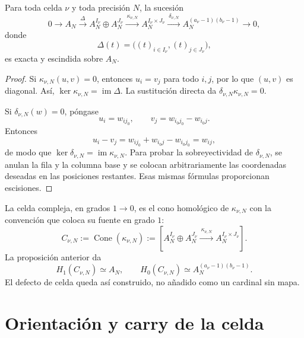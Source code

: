\begin{proposition}
\label{prop:pdfv2-coh-cell-exact}
Para toda celda \(\nu\) y toda precisión \(N\), la sucesión
\begin{equation}\label{eq:pdfv2-coh-exact-sequence}
 0\longrightarrow A_N
 \xrightarrow{\ \Delta\ }
 A_N^{I_\nu}\oplus A_N^{J_\nu}
 \xrightarrow{\ \kappa_{\nu,N}\ }
 A_N^{I_\nu\times J_\nu}
 \xrightarrow{\ \delta_{\nu,N}\ }
 A_N^{(a_\nu-1)(b_\nu-1)}
 \longrightarrow0,
\end{equation}
donde
\[
 \Delta(t)=\bigl((t)_{i\in I_\nu},(t)_{j\in J_\nu}\bigr),
\]
es exacta y escindida sobre \(A_N\).
\end{proposition}

\begin{proof}
Si \(\kappa_{\nu,N}(u,v)=0\), entonces \(u_i=v_j\) para todo \(i,j\),
por lo que \((u,v)\) es diagonal. Así,
\(\ker\kappa_{\nu,N}=\operatorname{im}\Delta\). La sustitución directa da
\(\delta_{\nu,N}\kappa_{\nu,N}=0\).

Si \(\delta_{\nu,N}(w)=0\), póngase
\[
 u_i=w_{i j_0},
 \qquad
 v_j=w_{i_0j_0}-w_{i_0j}.
\]
Entonces
\[
 u_i-v_j=w_{i j_0}+w_{i_0j}-w_{i_0j_0}=w_{ij},
\]
de modo que \(\ker\delta_{\nu,N}=\operatorname{im}\kappa_{\nu,N}\). Para
probar la sobreyectividad de \(\delta_{\nu,N}\), se anulan la fila y la
columna base y se colocan arbitrariamente las coordenadas deseadas en las
posiciones restantes. Esas mismas fórmulas proporcionan escisiones.
\end{proof}

La celda compleja, en grados \(1\to0\), es el cono homológico de
\(\kappa_{\nu,N}\) con la convención que coloca su fuente en grado \(1\):
\begin{equation}\label{eq:pdfv2-coh-cell-complex}
 C_{\nu,N}:=\operatorname{Cone}(\kappa_{\nu,N})
 :=\left[
 A_N^{I_\nu}\oplus A_N^{J_\nu}
 \xrightarrow{\ \kappa_{\nu,N}\ }
 A_N^{I_\nu\times J_\nu}
 \right].
\end{equation}
La proposición anterior da
\begin{equation}\label{eq:pdfv2-coh-cell-homology}
 H_1(C_{\nu,N})\simeq A_N,
 \qquad
 H_0(C_{\nu,N})\simeq A_N^{(a_\nu-1)(b_\nu-1)}.
\end{equation}
El defecto de celda queda así construido, no añadido como un cardinal sin
mapa.

\section{Orientación y carry de la celda}
\label{sec:pdfv2-coh-orientation-carry}

